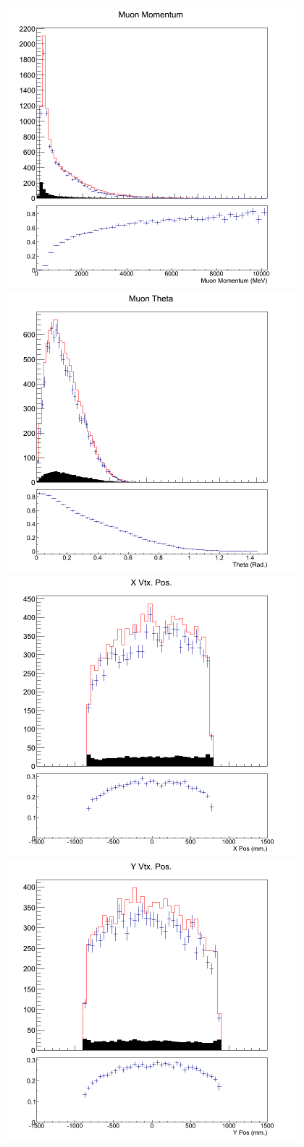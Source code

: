 \begin{figure}[h]
\centering
\includegraphics[width=3in]{Figures/TN100Plots/c_Pair_3.png}
\includegraphics[width=3in]{Figures/TN100Plots/c_Thair_3.png}
\includegraphics[width=3in]{Figures/TN100Plots/c_Xair_3.png}
\includegraphics[width=3in]{Figures/TN100Plots/c_Yair_3.png}

\end{figure}

